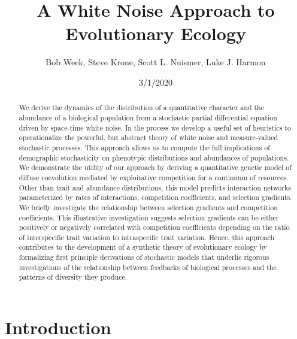 \documentclass[]{article}
\title{A White Noise Approach to Evolutionary Ecology}
\author{Bob Week, Steve Krone, Scott L. Nuismer, Luke J. Harmon}
\date{3/1/2020}
\begin{document}
\maketitle
\begin{abstract}
We derive the dynamics of the distribution of a quantitative character
and the abundance of a biological population from a stochastic partial
differential equation driven by space-time white noise. In the process
we develop a useful set of heuristics to operationalize the powerful,
but abstract theory of white noise and measure-valued stochastic
processes. This approach allows us to compute the full implications of
demographic stochasticity on phenotypic distributions and abundances of
populations. We demonstrate the utility of our approach by deriving a
quantitative genetic model of diffuse coevolution mediated by
exploitative competition for a continuum of resources. Other than trait
and abundance distributions, this model predicts interaction networks
parameterized by rates of interactions, competition coefficients, and
selection gradients. We briefly investigate the relationship between
selection gradients and competition coefficients. This illustrative
investigation suggests selection gradients can be either positively or
negatively correlated with competition coefficients depending on the
ratio of interspecific trait variation to intraspecific trait variation.
Hence, this approach contributes to the development of a synthetic
theory of evolutionary ecology by formalizing first principle
derivations of stochastic models that underlie rigorous investigations
of the relationship between feedbacks of biological processes and the
patterns of diversity they produce.
\end{abstract}

\hypertarget{introduction}{%
\section{Introduction}\label{introduction}}
\end{document}
